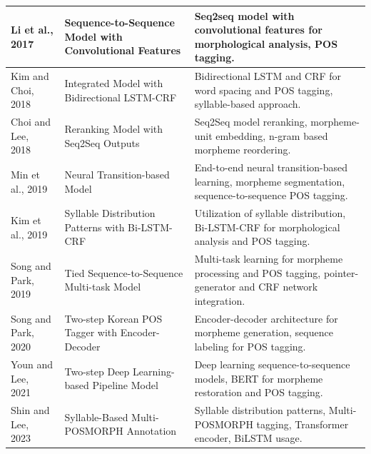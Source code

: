 \documentclass[AMS,STIX2COL]{WileyNJD-v2}
\begin{document}
\begin{table}[ht]
\begin{tabular}{|p{10mm}|p{24mm}|p{40mm}|}
            \hline
            Li et al., 2017~\cite{Li2017}         & Sequence-to-Sequence Model with Convolutional Features & Seq2seq model with convolutional features for morphological analysis, POS tagging.                                \\
            \hline
            Kim and Choi, 2018~\cite{KimSW2018}   & Integrated Model with Bidirectional LSTM-CRF           & Bidirectional LSTM and CRF for word spacing and POS tagging, syllable-based approach.                             \\
            \hline
            Choi and Lee, 2018~\cite{ChoiYS2018}  & Reranking Model with Seq2Seq Outputs                   & Seq2Seq model reranking, morpheme-unit embedding, n-gram based morpheme reordering.                               \\
            \hline
            Min et al., 2019~\cite{MinJW2019}     & Neural Transition-based Model                          & End-to-end neural transition-based learning, morpheme segmentation, sequence-to-sequence POS tagging.             \\
            \hline
            Kim et al., 2019~\cite{KimHM2019}     & Syllable Distribution Patterns with Bi-LSTM-CRF        & Utilization of syllable distribution, Bi-LSTM-CRF for morphological analysis and POS tagging.                     \\
            \hline
            Song and Park, 2019~\cite{SongHJ2019} & Tied Sequence-to-Sequence Multi-task Model             & Multi-task learning for morpheme processing and POS tagging, pointer-generator and CRF network integration.       \\
            \hline
            Song and Park, 2020~\cite{SongHJ2020} & Two-step Korean POS Tagger with Encoder-Decoder        & Encoder-decoder architecture for morpheme generation, sequence labeling for POS tagging.                          \\
            \hline
            Youn and Lee, 2021~\cite{YounJY2021}  & Two-step Deep Learning-based Pipeline Model            & Deep learning sequence-to-sequence models, BERT for morpheme restoration and POS tagging.                         \\
            \hline
            Shin and Lee, 2023~\cite{ShinHJ2023}  & Syllable-Based Multi-POSMORPH Annotation               & Syllable distribution patterns, Multi-POSMORPH tagging, Transformer encoder, BiLSTM usage.                        \\
            \hline
        \end{tabular}
    \end{table}
\end{document}
